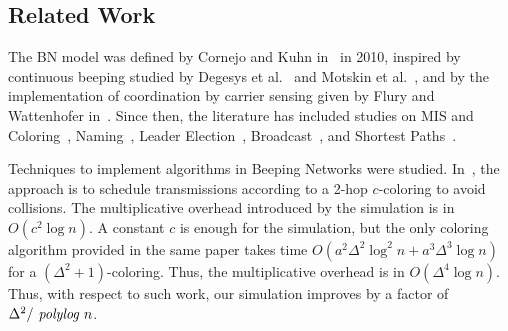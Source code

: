 \subsection{Related Work}
\label{sec:relwork}



The BN model was defined by Cornejo and Kuhn in~\cite{cornejo2010deploying} in 2010, inspired by 
continuous beeping studied by Degesys et al.~\cite{degesys2007desync} and Motskin et al.~\cite{motskin2009lightweight}, and by the implementation of coordination by carrier sensing given by Flury and Wattenhofer in~\cite{flury2010slotted}.
%
Since then, the literature has included studies on 
MIS and Coloring~\cite{afek2011biological,afek2013beeping,jeavons2016feedback,holzer2016brief,beauquier2018fast,casteigts2019design}, 
Naming~\cite{chlebus2017naming}, 
Leader Election~\cite{ghaffari2013near,forster2014deterministic,dufoulon2018beeping}, 
Broadcast~\cite{ghaffari2013near,hounkanli2015deterministic,hounkanli2016asynchronous,czumaj2019communicating,beauquier2019optimal},
and Shortest Paths~\cite{dufoulon2022beeping}.

Techniques to implement \congest algorithms in Beeping Networks were studied. In~\cite{beauquier2018fast},
the approach is to schedule transmissions according to a 2-hop $c$-coloring to avoid collisions. The multiplicative overhead introduced by the simulation is in $O(c^2 \log n)$. A constant $c$ is enough for the simulation, but the only coloring algorithm provided in the same paper takes time $O(a^2\Delta^2\log^2 n +a^3 \Delta^3 \log n)$ for a $(\Delta^2+1)$-coloring. Thus, the multiplicative overhead is in $O(\Delta^4 \log n)$. 
Thus, with respect to such work, our simulation improves by a factor of $\Delta^2/\text{\em\ polylog } n$.


